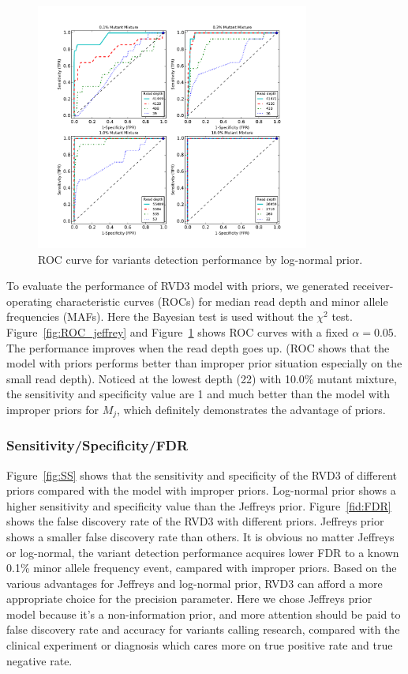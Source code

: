 \documentclass[11pt,reqno]{amsart}
\begin{document}
\begin{figure}[htbp]
\begin{center}
\includegraphics[width=90mm]{figs/ROC_without_chi2_lognormal.pdf}
\caption{ROC curve for variants detection performance by log-normal prior.}
\label{fig:ROC_lognormal}
\end{center}
\end{figure}


To evaluate the performance of RVD3 model with priors, we generated receiver-operating characteristic curves (ROCs) for median read depth and minor allele frequencies (MAFs).
Here the Bayesian test is used without the $\chi^2$ test. Figure~\ref{fig:ROC_jeffrey} and Figure~\ref{fig:ROC_lognormal} shows ROC curves with a fixed $\alpha=0.05$.
The performance improves when the read depth goes up. (ROC shows that the model with priors performs better than improper prior situation especially on the small read depth).
Noticed at the lowest depth (22) with 10.0\% mutant mixture, the sensitivity and specificity value are 1 and much better than the model with improper priors for $M_j$, which definitely demonstrates the advantage of priors.

\subsubsection{Sensitivity/Specificity/FDR}

Figure~\ref{fig:SS} shows that the sensitivity and specificity of the RVD3 of different priors compared with the model with improper priors.
Log-normal prior shows a higher sensitivity and specificity value than the Jeffreys prior.
Figure~\ref{fid:FDR} shows the false discovery rate of the RVD3 with different priors. Jeffreys prior shows a smaller false discovery rate than others.
It is obvious no matter Jeffreys or log-normal, the variant detection performance acquires lower FDR to a known 0.1\% minor allele frequency event, campared with improper priors.
Based on the various advantages for Jeffreys and log-normal prior, RVD3 can afford a more appropriate choice for the precision parameter.
Here we chose Jeffreys prior model because it's a non-information prior, and more attention should be paid to false discovery rate and accuracy for variants calling research, compared with the clinical experiment or diagnosis which cares more on true positive rate and true negative rate.
\end{document}
